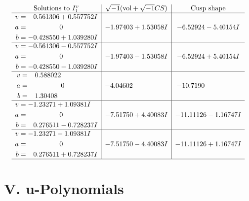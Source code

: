 \documentclass[1p]{elsarticle_modified}
\theoremstyle{definition}
\newcommand{\I}{\sqrt{-1}}
\begin{document}
$$\begin{array}{c|c|c}  
\text{Solutions to }I^v_{1}& \I (\text{vol} + \sqrt{-1}CS) & \text{Cusp shape}\\
 \hline 
\begin{aligned}
v &= -0.561306 + 0.557752 I \\
a &= \phantom{-0.000000 } 0 \\
b &= -0.428550 + 1.039280 I\end{aligned}
 & -1.97403 + 1.53058 I & -6.52924 - 5.40154 I \\ \hline\begin{aligned}
v &= -0.561306 - 0.557752 I \\
a &= \phantom{-0.000000 } 0 \\
b &= -0.428550 - 1.039280 I\end{aligned}
 & -1.97403 - 1.53058 I & -6.52924 + 5.40154 I \\ \hline\begin{aligned}
v &= \phantom{-}0.588022\phantom{ +0.000000I} \\
a &= \phantom{-0.000000 } 0 \\
b &= \phantom{-}1.30408\phantom{ +0.000000I}\end{aligned}
 & -4.04602\phantom{ +0.000000I} & -10.7190\phantom{ +0.000000I} \\ \hline\begin{aligned}
v &= -1.23271 + 1.09381 I \\
a &= \phantom{-0.000000 } 0 \\
b &= \phantom{-}0.276511 - 0.728237 I\end{aligned}
 & -7.51750 + 4.40083 I & -11.11126 - 1.16747 I \\ \hline\begin{aligned}
v &= -1.23271 - 1.09381 I \\
a &= \phantom{-0.000000 } 0 \\
b &= \phantom{-}0.276511 + 0.728237 I\end{aligned}
 & -7.51750 - 4.40083 I & -11.11126 + 1.16747 I\\
 \hline 
 \end{array}$$\newpage
\newpage\renewcommand{\arraystretch}{1}
\centering \section*{ V. u-Polynomials}
\end{document}
